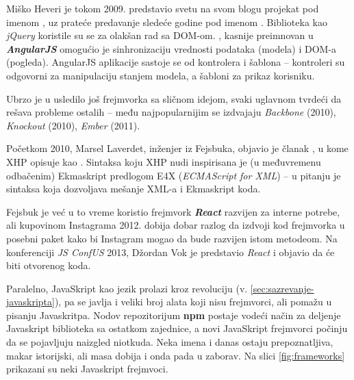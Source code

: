 Miško Heveri je tokom 2009. predstavio svetu na svom blogu projekat pod imenom  \cite{misko:hello-world}, uz prateće predavanje sledeće godine pod imenom  \cite{misko-radically-different-ajax-apps}.
Biblioteka kao \textsl{jQuery} koristile su se za olakšan rad sa DOM-om.
, kasnije preimnovan u \textsl{\textbf{AngularJS}} omogućio je sinhronizaciju  vrednosti podataka (modela) i DOM-a (pogleda).
AngularJS aplikacije sastoje se od kontrolera i šablona -- kontroleri su odgovorni za manipulaciju stanjem modela, a šabloni za prikaz korisniku.

Ubrzo je u usledilo još frejmvorka sa sličnom idejom, svaki uglavnom tvrdeći da rešava probleme ostalih -- među najpopularnijim se izdvajaju \textsl{Backbone} (2010), \textsl{Knockout} (2010), \textsl{Ember} (2011).

Početkom 2010, Marsel Laverdet, inženjer iz Fejsbuka, objavio je članak , u kome XHP opisuje kao  \cite{facebook:xhp}.
Sintaksa koju XHP nudi inspirisana je (u međuvremenu odbačenim) Ekmaskript predlogom E4X (\textsl{ECMAScript for XML}) -- u pitanju je sintaksa koja dozvoljava mešanje XML-a i Ekmaskript koda.

Fejsbuk je već u to vreme koristio frejmvork \textsl{\textbf{React}} razvijen za interne potrebe, ali kupovinom Instagrama 2012. dobija dobar razlog da izdvoji kod frejmvorka u posebni paket kako bi Instagram mogao da bude razvijen istom metodeom.
Na konferenciji \textit{JS ConfUS} 2013, Džordan Vok je predstavio \textsl{React} i objavio da će biti otvorenog koda.

Paralelno, JavaSkript kao jezik prolazi kroz revoluciju (v. \cref{sec:sazrevanje-javaskripta}), pa se javlja i veliki broj alata koji nisu frejmvorci, ali pomažu u pisanju Javaskritpa.
Nodov repozitorijum \textbf{npm} postaje vodeći način za deljenje Javaskript biblioteka sa ostatkom zajednice, a novi JavaSkript frejmvorci počinju da se pojavljuju naizgled niotkuda.
Neka imena i danas ostaju prepoznatljiva, makar istorijski, ali masa dobija  i onda pada u zaborav.
Na slici \ref{fig:frameworks} prikazani su neki Javaskript frejmvoci.

